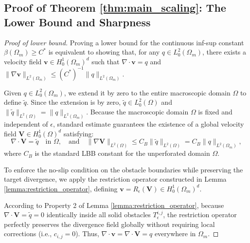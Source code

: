 \documentclass{elsarticle}
\begin{document}
\subsection{Proof of Theorem \ref{thm:main_scaling}: The Lower Bound and Sharpness}

\begin{proof}[Proof of lower bound]
    Proving a lower bound for the continuous inf-sup constant $\beta(\Omega_m) \ge C^*$ is equivalent to showing that, for any $q \in L_0^2(\Omega_m)$, there exists a velocity field $\mathbf{v} \in H_0^1(\Omega_m)^d$ such that $\nabla \cdot \mathbf{v} = q$ and $\|\nabla \mathbf{v}\|_{L^2(\Omega_m)} \le (C^*)^{-1} \|q\|_{L^2(\Omega_m)}$.

    Given $q \in L_0^2(\Omega_m)$, we extend it by zero to the entire macroscopic domain $\Omega$ to define $\tilde{q}$. Since the extension is by zero, $\tilde{q} \in L_0^2(\Omega)$ and $\|\tilde{q}\|_{L^2(\Omega)} = \|q\|_{L^2(\Omega_m)}$. Because the macroscopic domain $\Omega$ is fixed and independent of $\epsilon$, standard estimate guarantees the existence of a global velocity field $\mathbf{V} \in H_0^1(\Omega)^d$ satisfying:
    \begin{equation}
        \nabla \cdot \mathbf{V} = \tilde{q} \quad \text{in } \Omega, \quad \text{and} \quad \|\nabla \mathbf{V}\|_{L^2(\Omega)} \le C_B \|\tilde{q}\|_{L^2(\Omega)} = C_B \|q\|_{L^2(\Omega_m)},
    \end{equation}
    where $C_B$ is the standard LBB constant for the unperforated domain $\Omega$.

    To enforce the no-slip condition on the obstacle boundaries while preserving the target divergence, we apply the restriction operator constructed in Lemma \ref{lemma:restriction_operator}, defining $\mathbf{v} = R_{\epsilon}(\mathbf{V}) \in H_0^1(\Omega_m)^d$.

    According to Property 2 of Lemma \ref{lemma:restriction_operator}, because $\nabla \cdot \mathbf{V} = \tilde{q} = 0$ identically inside all solid obstacles $T_{\epsilon}^{i,j}$, the restriction operator perfectly preserves the divergence field globally without requiring local corrections (i.e., $c_{i,j} = 0$). Thus, $\nabla \cdot \mathbf{v} = \nabla \cdot \mathbf{V} = q$ everywhere in $\Omega_m$.


\end{proof}
\end{document}
